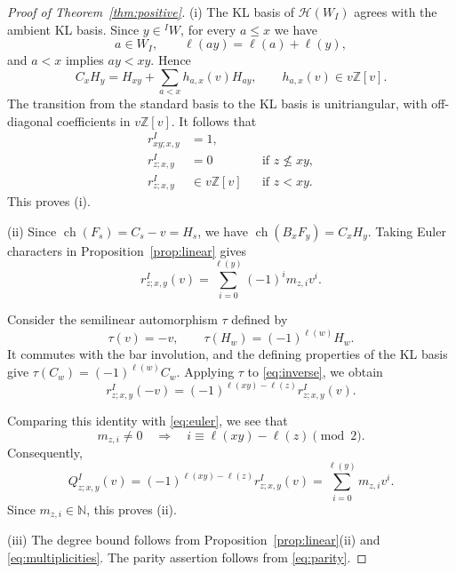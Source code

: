 \documentclass[11pt,a4paper]{article}
\numberwithin{equation}{section}
\theoremstyle{remark}
\newcommand{\Z}{\mathbb Z}
\newcommand{\N}{\mathbb N}
\newcommand{\HH}{\mathcal H}
\newcommand{\ch}{\operatorname{ch}}
\begin{document}
\begin{proof}[Proof of Theorem~\ref{thm:positive}]
	(i) The KL basis of $\HH(W_I)$ agrees with the
	ambient KL basis. Since $y\in{}^I W$, for every
	$a\le x$ we have
	\[
	a\in W_I,\qquad
	\ell(ay)=\ell(a)+\ell(y),
	\]
	and $a<x$ implies $ay<xy$. Hence
	\[
	C_xH_y=H_{xy}+
	\sum_{a<x}h_{a,x}(v)H_{ay},
	\qquad h_{a,x}(v)\in v\Z[v].
	\]
	The transition from the standard basis to the
	KL basis is unitriangular, with off-diagonal
	coefficients in $v\Z[v]$. It follows that
	\begin{equation}\label{eq:triangular}
		\begin{aligned}
			r^I_{xy;x,y}&=1,\\
			r^I_{z;x,y}&=0
			&&\text{if }z\not\le xy,\\
			r^I_{z;x,y}&\in v\Z[v]
			&&\text{if }z<xy.
		\end{aligned}
	\end{equation}
	This proves (i).
	
	(ii) Since $\ch(F_s)=C_s-v=H_s$, we have
	$\ch(B_xF_y)=C_xH_y$.
	Taking Euler characters in
	Proposition~\ref{prop:linear} gives
	\begin{equation}\label{eq:euler}
		r^I_{z;x,y}(v)
		=\sum_{i=0}^{\ell(y)}(-1)^i m_{z,i}v^i.
	\end{equation}
	
	Consider the semilinear automorphism
	$\tau$ defined by
	\[
	\tau(v)=-v,\qquad
	\tau(H_w)=(-1)^{\ell(w)}H_w.
	\]
	It commutes with the bar involution, and the
	defining properties of the KL basis give
	$\tau(C_w)=(-1)^{\ell(w)}C_w$.
	Applying $\tau$ to \eqref{eq:inverse}, we obtain
	\begin{equation*}
		r^I_{z;x,y}(-v)
		=(-1)^{\ell(xy)-\ell(z)}
		r^I_{z;x,y}(v).
	\end{equation*}
	
	Comparing this identity with \eqref{eq:euler}, we see that
		\begin{equation}\label{eq:parity}
	m_{z,i}\ne0
	\quad\Longrightarrow\quad
	i\equiv\ell(xy)-\ell(z)\pmod2.
\end{equation}
	Consequently,
	\begin{equation}\label{eq:multiplicities}
		Q^I_{z;x,y}(v)
		=(-1)^{\ell(xy)-\ell(z)}
		r^I_{z;x,y}(v)
		=\sum_{i=0}^{\ell(y)}m_{z,i}v^i.
	\end{equation}
	Since $m_{z,i}\in\N$, this proves (ii).
	
	(iii) The degree bound follows from
	Proposition~\ref{prop:linear}(ii) and
	\eqref{eq:multiplicities}.
	The parity assertion follows from
	\eqref{eq:parity}.
\end{proof}
\end{document}
